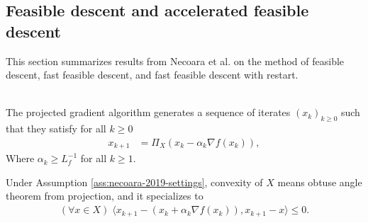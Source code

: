 \documentclass[12pt]{report}
\begin{document}
        \subsection{Feasible descent and accelerated feasible descent}
            This section summarizes results from Necoara et al. on the method of feasible descent, fast feasible descent, and fast feasible descent with restart. 
            \begin{definition}\label{def:projg-alg}\;\\
                The projected gradient algorithm generates a sequence of iterates $(x_k)_{k \ge 0}$ such that they satisfy for all $k \ge 0$
                \begin{align*}
                    x_{k + 1} &= \Pi_X(x_k - \alpha_k \nabla f(x_k)), 
                \end{align*}
                Where $\alpha_k \ge L_f^{-1}$ for all $k \ge 1$. 
            \end{definition}
            Under Assumption \ref{ass:necoara-2019-settings}, convexity of $X$ means obtuse angle theorem from projection, and it specializes to 
            \begin{align}\label{ineq:projg-variational-ineq}
                (\forall x \in X)\; \langle x_{k + 1} - (x_k + \alpha_k \nabla f(x_k)), x_{k + 1} - x\rangle \le 0. 
            \end{align}
\end{document}
